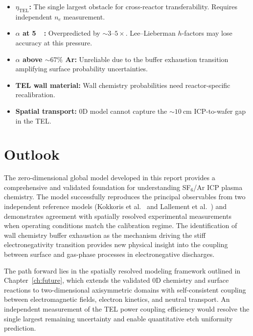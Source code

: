 \documentclass[11pt,a4paper]{report}
\begin{document}
\begin{itemize}[nosep]
\item \textbf{$\eta_\mathrm{TEL}$:} The single largest obstacle for cross-reactor transferability.  Requires independent $n_e$ measurement.
\item \textbf{$\alpha$ at \SI{5}{\milli\torr}:} Overpredicted by ${\sim}3$--$5\times$.  Lee--Lieberman $h$-factors may lose accuracy at this pressure.
\item \textbf{$\alpha$ above ${\sim}67\%$ Ar:} Unreliable due to the buffer exhaustion transition amplifying surface probability uncertainties.
\item \textbf{TEL wall material:} Wall chemistry probabilities need reactor-specific recalibration.
\item \textbf{Spatial transport:} 0D model cannot capture the ${\sim}\SI{10}{\centi\meter}$ ICP-to-wafer gap in the TEL.
\end{itemize}

\section{Outlook}
\label{sec:conc_outlook}

The zero-dimensional global model developed in this report provides a comprehensive and validated foundation for understanding SF$_6$/Ar ICP plasma chemistry.  The model successfully reproduces the principal observables from two independent reference models (Kokkoris et al.~\cite{Kokkoris2009} and Lallement et al.~\cite{Lallement2009}) and demonstrates agreement with spatially resolved experimental measurements~\cite{Mettler2025} when operating conditions match the calibration regime.  The identification of wall chemistry buffer exhaustion as the mechanism driving the stiff electronegativity transition provides new physical insight into the coupling between surface and gas-phase processes in electronegative discharges.

The path forward lies in the spatially resolved modeling framework outlined in Chapter~\ref{ch:future}, which extends the validated 0D chemistry and surface reactions to two-dimensional axisymmetric domains with self-consistent coupling between electromagnetic fields, electron kinetics, and neutral transport.  An independent measurement of the TEL power coupling efficiency would resolve the single largest remaining uncertainty and enable quantitative etch uniformity prediction.
\end{document}
